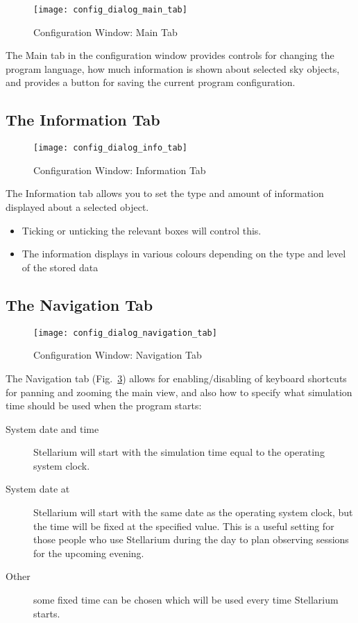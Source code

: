 \begin{figure}[p]
\centering\texttt{[image: config\_dialog\_main\_tab]}
\caption{Configuration Window: Main Tab}
\label{fig:gui:configuration:main}
\end{figure}



The Main tab in the configuration window provides controls for changing
the program language, how much information is shown about selected sky
objects, and provides a button for saving the current program
configuration.

\subsection{The Information Tab}
\label{sec:gui:configuration:info}


\begin{figure}[p]
\centering\texttt{[image: config\_dialog\_info\_tab]}
\caption{Configuration Window: Information Tab}
\label{fig:gui:configuration:info}
\end{figure}

The Information tab allows you to set the type and amount of information
displayed about a selected object.
\begin{itemize}
\item Ticking or unticking the relevant boxes will control this.
\item The information displays in various colours depending on the type and
level of the stored data
\end{itemize}

\subsection{The Navigation Tab}
\label{sec:gui:configuration:nav}


\begin{figure}[p]
\centering\texttt{[image: config\_dialog\_navigation\_tab]}
\caption{Configuration Window: Navigation Tab}
\label{fig:gui:configuration:nav}
\end{figure}

The Navigation tab (Fig.~\ref{fig:gui:configuration:nav}) allows for
enabling/disabling of keyboard shortcuts for panning and zooming the
main view, and also how to specify what simulation time should be used
when the program starts:

\begin{description}
\item[System date and time] Stellarium will start with
  the simulation time equal to the operating system clock.
\item[System date at] Stellarium will start with the
  same date as the operating system clock, but the time will be fixed at
  the specified value. This is a useful setting for those people who use
  Stellarium during the day to plan observing sessions for the upcoming
  evening.
\item[Other] some fixed time can be chosen which will
  be used every time Stellarium starts.
\end{description}

